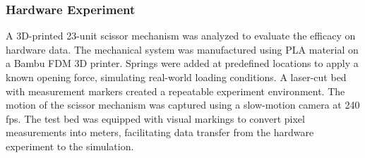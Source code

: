 \subsubsection{Hardware Experiment}

A 3D-printed 23-unit scissor mechanism was analyzed to evaluate the efficacy on hardware data. The mechanical system was manufactured using PLA material on a Bambu FDM 3D printer. Springs were added at predefined locations to apply a known opening force, simulating real-world loading conditions. A laser-cut bed with measurement markers created a repeatable experiment environment. The motion of the scissor mechanism was captured using a slow-motion camera at 240 fps. The test bed was equipped with visual markings to convert pixel measurements into meters, facilitating data transfer from the hardware experiment to the simulation. 






